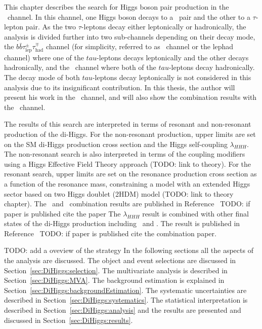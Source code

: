 This chapter describes the search for Higgs boson pair production in the
\bbtt\ channel. 
In this channel, one Higgs boson decays to a \bquark\ pair 
and the other to a $\tau$-lepton pair. 
As the two $\tau$-leptons decay either leptonically or hadronically, 
the analysis is divided further into two sub-channels depending on
their decay mode, 
the $b\bar{b}\tau_{\text{lep}}^{\pm}\tau_{\text{had}}^{\mp}$ channel 
(for simplicity, referred to as \bbttlh\ channel or the lephad channel)
where one of the $tau$-leptons decays leptonically and the other decays
hadronically, 
and the \bbtthh\ channel where both of the $tau$-leptons decay hadronically. 
The decay mode of both $tau$-leptons decay
leptonically is not considered in this analysis 
due to its insignificant contribution. 
In this thesis, the author will present his work 
in the \bbttlh\ channel, and will also show the combination results with 
the \bbtthh\ channel.


The results of this search are interpreted in terms of resonant and 
non-resonant production of the di-Higgs.
For the non-resonant production, upper limits are set on the SM di-Higgs production
cross section and the Higgs self-coupling $\lambda_{HHH}$.
The non-resonant search is also interpreted in terms of the coupling modifiers using a
Higgs Effective Field Theory approach (TODO: link to theory).
For the resonant search, upper limits are set on the resonance production cross section 
as a function of the resonance mass, 
constraining a model with an extended Higgs sector based on two Higgs doublet (2HDM) model
(TODO: link to theory chapter).
The \bbttlh\ and \bbtthh\
combination results are published in Reference~\cite{dihiggs-conf} 
TODO: if paper is published cite the paper
The $\lambda_{HHH}$ result is combined with other final states of the di-Higgs production
including \bbbb\ and \bbyy. 
The result is published in Reference~\cite{ATLAS-CONF-2021-052} TODO: if paper is published cite the combination paper. 

TODO: add a oveview of the strategy 
In the following sections all the aspects of the analysis are discussed. 
The object and event selections are discussed in Section~\ref{sec:DiHiggs:selection}.
The multivariate analysis is described in Section~\ref{sec:DiHiggs:MVA}. 
The background estimation is explained in Section~\ref{sec:DiHiggs:backgroundEstimation}. 
The systematic uncertainties are described in Section~\ref{sec:DiHiggs:systematics}. 
The statistical interpretation is described in Section~\ref{sec:DiHiggs:analysis}
and the results are presented and discussed in Section~\ref{sec:DiHiggs:results}.